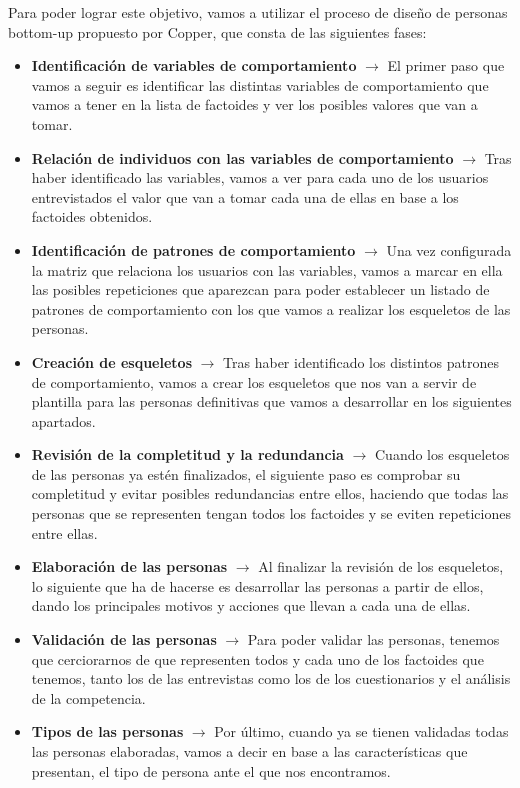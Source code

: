 Para poder lograr este objetivo, vamos a utilizar el proceso de diseño de personas bottom-up propuesto por Copper, que consta de las siguientes fases:
\begin{itemize}
    \item \textbf{Identificación de variables de comportamiento} $\rightarrow$ El primer paso que vamos a seguir es identificar las distintas variables de comportamiento que vamos a tener en la lista de factoides y ver los posibles valores que van a tomar.
    \item \textbf{Relación de individuos con las variables de comportamiento} $\rightarrow$ Tras haber identificado las variables, vamos a ver para cada uno de los usuarios entrevistados el valor que van a tomar cada una de ellas en base a los factoides obtenidos.
    \item \textbf{Identificación de patrones de comportamiento} $\rightarrow$ Una vez configurada la matriz que relaciona los usuarios con las variables, vamos a marcar en ella las posibles repeticiones que aparezcan para poder establecer un listado de patrones de comportamiento con los que vamos a realizar los esqueletos de las personas.
    \item \textbf{Creación de esqueletos} $\rightarrow$ Tras haber identificado los distintos patrones de comportamiento, vamos a crear los esqueletos que nos van a servir de plantilla para las personas definitivas que vamos a desarrollar en los siguientes apartados.
    \item \textbf{Revisión de la completitud y la redundancia} $\rightarrow$ Cuando los esqueletos de las personas ya estén finalizados, el siguiente paso es comprobar su completitud y evitar posibles redundancias entre ellos, haciendo que todas las personas que se representen tengan todos los factoides y se eviten repeticiones entre ellas.
    \item \textbf{Elaboración de las personas} $\rightarrow$ Al finalizar la revisión de los esqueletos, lo siguiente que ha de hacerse es desarrollar las personas a partir de ellos, dando los principales motivos y acciones que llevan a cada una de ellas.
    \item \textbf{Validación de las personas} $\rightarrow$ Para poder validar las personas, tenemos que cerciorarnos de que representen todos y cada uno de los factoides que tenemos, tanto los de las entrevistas como los de los cuestionarios y el análisis de la competencia.
    \item \textbf{Tipos de las personas} $\rightarrow$ Por último, cuando ya se tienen validadas todas las personas elaboradas, vamos a decir en base a las características que presentan, el tipo de persona ante el que nos encontramos.
\end{itemize}

